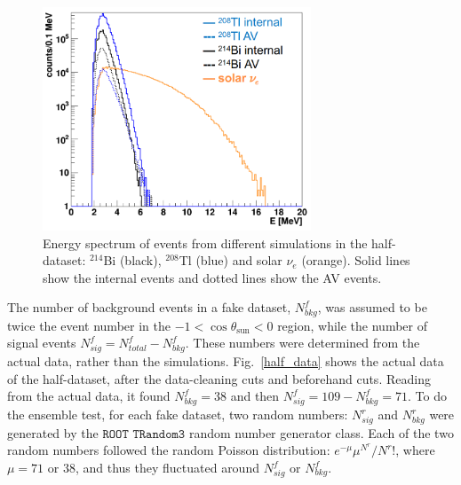 \begin{figure}[!htb]
	\centering
	\includegraphics[width=8cm]{TMVA_bkgs_1.png}
	\caption[Energy spectrum of events from different simulations.]{Energy spectrum of events from different simulations in the half-dataset: $^{214}$Bi (black), $^{208}$Tl (blue) and solar $\nu_e$ (orange). Solid lines show the internal events and dotted lines show the AV events.	\label{TMVA_bkgs_1}}
\end{figure}


The number of background events in a fake dataset, $N^f_{bkg}$, was assumed to be twice the event number in the $-1<\cos\theta_\mathrm{sun}<0$ region, while the number of signal events $N^f_{sig}=N^f_{total}-N^f_{bkg}$. These numbers were determined from the actual data, rather than the simulations. Fig.~\ref{half_data} shows the actual data of the half-dataset, after the data-cleaning cuts and beforehand cuts. Reading from the actual data, it found $N^f_{bkg}=38$ and then $N^f_{sig}=109-N^f_{bkg}=71$. To do the ensemble test, for each fake dataset, two random numbers: $N^r_{sig}$ and $N^r_{bkg}$ were generated by the $\texttt{ROOT TRandom3}$ random number generator class. Each of the two random numbers followed the random Poisson distribution: $e^{-\mu}\mu^{N^r}/N^r!$, where $\mu=71$ or $38$, and thus they fluctuated around $N^f_{sig}$ or $N^f_{bkg}$.

